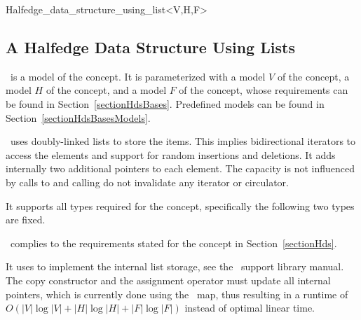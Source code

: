 \begin{ccClassTemplate}{Halfedge_data_structure_using_list<V,H,F>}
\subsection{A Halfedge Data Structure Using Lists}
\label{sectionHdsUsingList}

\ccDefinition

\ccClassTemplateName\ is a model of the 
concept. It is parameterized with a model $V$ of the 
concept, a model $H$ of the  concept, and a model
$F$ of the  concept, whose requirements can be found
in Section~\ref{sectionHdsBases}.  Predefined models can be found in
Section~\ref{sectionHdsBasesModels}.

\ccClassTemplateName\ uses doubly-linked lists to store the items.
This implies bidirectional iterators to access the elements and
support for random insertions and deletions. It adds internally two
additional pointers to each element.  The capacity is not influenced
by calls to  and calling  do not
invalidate any iterator or circulator.


\ccTypes

It supports all types required for the  concept,
specifically the following two types are fixed.

\ccGlue
{}

\ccOperations

\ccClassTemplateName\ complies to the requirements stated for the
concept  in Section~\ref{sectionHds}.

\ccImplementation

It uses  to implement the internal list
storage, see the \cgal\ support library manual. The copy constructor
and the assignment operator must update all internal pointers, which
is currently done using the \stl\ map, thus resulting in a runtime of
$O( |V| \log |V| + |H| \log |H| + |F| \log |F|)$ instead of optimal
linear time.

\end{ccClassTemplate}


